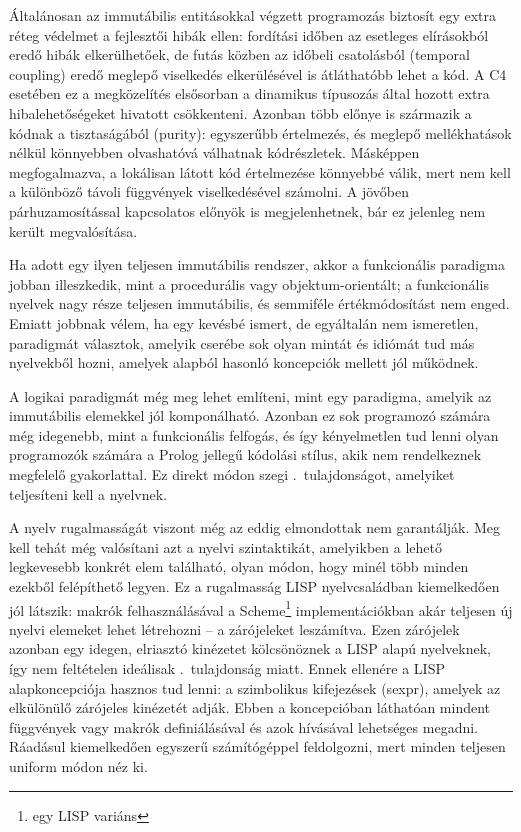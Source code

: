Általánosan az immutábilis entitásokkal végzett programozás biztosít egy extra réteg védelmet a fejlesztői hibák ellen: fordítási időben az esetleges elírásokból eredő hibák elkerülhetőek, de futás közben az időbeli csatolásból (temporal coupling) eredő meglepő viselkedés elkerülésével is átláthatóbb lehet a kód.
A C4 esetében ez a megközelítés elsősorban a dinamikus típusozás által hozott extra hibalehetőségeket hivatott csökkenteni. 
Azonban több előnye is származik a kódnak a tisztaságából (purity): egyszerűbb értelmezés, és meglepő mellékhatások nélkül könnyebben olvashatóvá válhatnak kódrészletek.
Másképpen megfogalmazva, a lokálisan látott kód értelmezése könnyebbé válik, mert nem kell a különböző távoli függvények viselkedésével számolni.
A jövőben párhuzamosítással kapcsolatos előnyök is megjelenhetnek, bár ez jelenleg nem került megvalósítása.

Ha adott egy ilyen teljesen immutábilis rendszer, akkor a funkcionális paradigma jobban illeszkedik, mint a procedurális vagy objektum-orientált; a funkcionális nyelvek nagy része teljesen immutábilis, és semmiféle értékmódosítást nem enged.
Emiatt jobbnak vélem, ha egy kevésbé ismert, de egyáltalán nem ismeretlen, paradigmát választok, amelyik cserébe sok olyan mintát és idiómát tud más nyelvekből hozni, amelyek alapból hasonló koncepciók mellett jól működnek.

A logikai paradigmát még meg lehet említeni, mint egy paradigma, amelyik az immutábilis elemekkel jól komponálható.
Azonban ez sok programozó számára még idegenebb, mint a funkcionális felfogás, és így kényelmetlen tud lenni olyan programozók számára a Prolog jellegű kódolási stílus, akik nem rendelkeznek megfelelő gyakorlattal.
Ez direkt módon szegi .~tulajdonságot, amelyiket teljesíteni kell a nyelvnek.

A nyelv rugalmasságát viszont még az eddig elmondottak nem garantálják.
Meg kell tehát még valósítani azt a nyelvi szintaktikát, amelyikben a lehető legkevesebb konkrét elem található, olyan módon, hogy minél több minden ezekből felépíthető legyen.
Ez a rugalmasság LISP nyelvcsaládban \cite{mccarthyRecursiveFunctionsSymbolic1960} kiemelkedően jól látszik: makrók felhasználásával a Scheme\footnote{egy LISP variáns} implementációkban akár teljesen új nyelvi elemeket lehet létrehozni \cite{freesoftwarefoundationinc.SyntaxRulesGuile2025} -- a zárójeleket leszámítva.
Ezen zárójelek azonban egy idegen, elriasztó kinézetet kölcsönöznek a LISP alapú nyelveknek, így nem feltételen ideálisak .~tulajdonság miatt.
Ennek ellenére a LISP alapkoncepciója hasznos tud lenni: a szimbolikus kifejezések (\gls{sexpr}), amelyek az elkülönülő zárójeles kinézetét adják.
Ebben a koncepcióban láthatóan mindent függvények vagy makrók definiálásával és azok hívásával lehetséges megadni.
Ráadásul kiemelkedően egyszerű számítógéppel feldolgozni, mert minden teljesen uniform módon néz ki.

